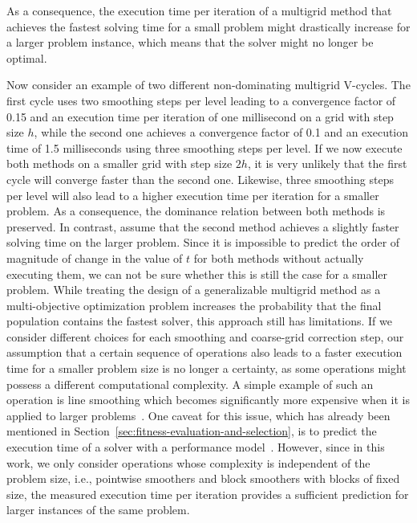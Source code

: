 As a consequence, the execution time per iteration of a multigrid method that achieves the fastest solving time for a small problem might drastically increase for a larger problem instance, which means that the solver might no longer be optimal.

Now consider an example of two different non-dominating multigrid V-cycles.
The first cycle uses two smoothing steps per level leading to a convergence factor of 0.15 and an execution time per iteration of one millisecond on a grid with step size $h$, while the second one achieves a convergence factor of 0.1 and an execution time of 1.5 milliseconds using three smoothing steps per level.
If we now execute both methods on a smaller grid with step size $2h$, it is very unlikely that the first cycle will converge faster than the second one.
Likewise, three smoothing steps per level will also lead to a higher execution time per iteration for a smaller problem.
As a consequence, the dominance relation between both methods is preserved.
In contrast, assume that the second method achieves a slightly faster solving time on the larger problem.
Since it is impossible to predict the order of magnitude of change in the value of $t$ for both methods without actually executing them, we can not be sure whether this is still the case for a smaller problem.
While treating the design of a generalizable multigrid method as a multi-objective optimization problem increases the probability that the final population contains the fastest solver, this approach still has limitations.
If we consider different choices for each smoothing and coarse-grid correction step, our assumption that a certain sequence of operations also leads to a faster execution time for a smaller problem size is no longer a certainty, as some operations might possess a different computational complexity.
A simple example of such an operation is line smoothing which becomes significantly more expensive when it is applied to larger problems~\cite{trottenberg2000multigrid}.
One caveat for this issue, which has already been mentioned in Section~\ref{sec:fitness-evaluation-and-selection}, is to predict the execution time of a solver with a performance model~\cite{williams2009roofline,hager2016exploring}.
However, since in this work, we only consider operations whose complexity is independent of the problem size, i.e., pointwise smoothers and block smoothers with blocks of fixed size, the measured execution time per iteration provides a sufficient prediction for larger instances of the same problem.

